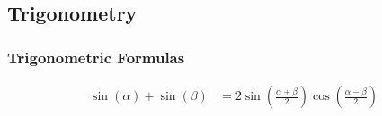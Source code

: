 \subsection{Trigonometry} \label{app:Trig}
	\subsubsection{Trigonometric Formulas} \label{subsubsec:Trig Formulas}
		\begin{align}
			\sin \left( \alpha \right) + \sin \left( \beta \right) &= 2 \sin \left( \frac{\alpha + \beta}{2} \right) \cos\left( \frac{\alpha - \beta}{2} \right)  \label{eq:Sin plus Sin with diff Angles}
		\end{align}